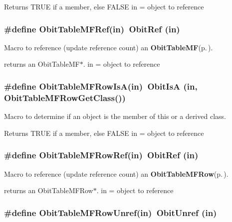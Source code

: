 Returns TRUE if a member, else FALSE in = object to reference 
\subsubsection{\setlength{\rightskip}{0pt plus 5cm}\#define Obit\-Table\-MFRef(in)\ Obit\-Ref (in)}\label{ObitTableMF_8h_a2}


Macro to reference (update reference count) an {\bf Obit\-Table\-MF}{\rm (p.\,\pageref{structObitTableMF})}. 

returns an Obit\-Table\-MF$\ast$. in = object to reference 
\subsubsection{\setlength{\rightskip}{0pt plus 5cm}\#define Obit\-Table\-MFRow\-Is\-A(in)\ Obit\-Is\-A (in, Obit\-Table\-MFRow\-Get\-Class())}\label{ObitTableMF_8h_a6}


Macro to determine if an object is the member of this or a derived class. 

Returns TRUE if a member, else FALSE in = object to reference 
\subsubsection{\setlength{\rightskip}{0pt plus 5cm}\#define Obit\-Table\-MFRow\-Ref(in)\ Obit\-Ref (in)}\label{ObitTableMF_8h_a5}


Macro to reference (update reference count) an {\bf Obit\-Table\-MFRow}{\rm (p.\,\pageref{structObitTableMFRow})}. 

returns an Obit\-Table\-MFRow$\ast$. in = object to reference 
\subsubsection{\setlength{\rightskip}{0pt plus 5cm}\#define Obit\-Table\-MFRow\-Unref(in)\ Obit\-Unref (in)}\label{ObitTableMF_8h_a4}


